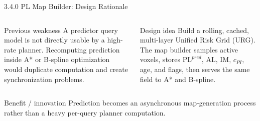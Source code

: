 \documentclass[10pt,aspectratio=169,xcolor=dvipsnames]{beamer}
\newcommand{\PL}{\mathrm{PL}}
\newcommand{\AL}{\mathrm{AL}}
\newcommand{\IM}{\mathrm{IM}}
\begin{document}

\begin{frame}{3.4.0 PL Map Builder: Design Rationale}

  \small
  \begin{columns}[T]
    \begin{alertblock}{Previous weakness}
      \footnotesize
      A predictor query model is not directly usable by a high-rate planner. Recomputing prediction inside A* or B-spline optimization would duplicate computation and create synchronization problems.
    \end{alertblock}
    \begin{exampleblock}{Design idea}
      \footnotesize
      Build a rolling, cached, multi-layer Unified Risk Grid (URG). The map builder samples active voxels, stores $\PL^{pred}$, $\AL$, $\IM$, $c_{PI}$, age, and flags, then serves the same field to A* and B-spline.
    \end{exampleblock}
  \end{columns}
  \begin{block}{Benefit / innovation}
    \footnotesize Prediction becomes an asynchronous map-generation process rather than a heavy per-query planner computation.
  \end{block}

\end{frame}
\end{document}
